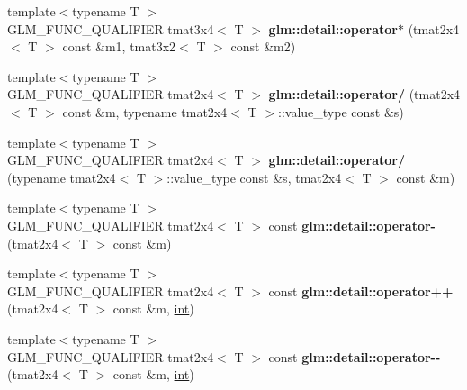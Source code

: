 \begin{DoxyCompactItemize}
\item 
\hypertarget{namespaceglm_1_1detail_a83d520b3203d51074292b3d0191d7bd8}{}{\footnotesize template$<$typename T $>$ }\\G\+L\+M\+\_\+\+F\+U\+N\+C\+\_\+\+Q\+U\+A\+L\+I\+F\+I\+E\+R tmat3x4$<$ T $>$ {\bfseries glm\+::detail\+::operator$\ast$} (tmat2x4$<$ T $>$ const \&m1, tmat3x2$<$ T $>$ const \&m2)\label{namespaceglm_1_1detail_a83d520b3203d51074292b3d0191d7bd8}

\item 
\hypertarget{namespaceglm_1_1detail_abb99f6f388a96ad5797dca045610b57b}{}{\footnotesize template$<$typename T $>$ }\\G\+L\+M\+\_\+\+F\+U\+N\+C\+\_\+\+Q\+U\+A\+L\+I\+F\+I\+E\+R tmat2x4$<$ T $>$ {\bfseries glm\+::detail\+::operator/} (tmat2x4$<$ T $>$ const \&m, typename tmat2x4$<$ T $>$\+::value\+\_\+type const \&s)\label{namespaceglm_1_1detail_abb99f6f388a96ad5797dca045610b57b}

\item 
\hypertarget{namespaceglm_1_1detail_a518f1f3078503dbc3705a1af12856684}{}{\footnotesize template$<$typename T $>$ }\\G\+L\+M\+\_\+\+F\+U\+N\+C\+\_\+\+Q\+U\+A\+L\+I\+F\+I\+E\+R tmat2x4$<$ T $>$ {\bfseries glm\+::detail\+::operator/} (typename tmat2x4$<$ T $>$\+::value\+\_\+type const \&s, tmat2x4$<$ T $>$ const \&m)\label{namespaceglm_1_1detail_a518f1f3078503dbc3705a1af12856684}

\item 
\hypertarget{namespaceglm_1_1detail_afb8d51d85044dc70a1793fe659514f72}{}{\footnotesize template$<$typename T $>$ }\\G\+L\+M\+\_\+\+F\+U\+N\+C\+\_\+\+Q\+U\+A\+L\+I\+F\+I\+E\+R tmat2x4$<$ T $>$ const {\bfseries glm\+::detail\+::operator-\/} (tmat2x4$<$ T $>$ const \&m)\label{namespaceglm_1_1detail_afb8d51d85044dc70a1793fe659514f72}

\item 
\hypertarget{namespaceglm_1_1detail_ad61346ffce65066d622042d648693fb0}{}{\footnotesize template$<$typename T $>$ }\\G\+L\+M\+\_\+\+F\+U\+N\+C\+\_\+\+Q\+U\+A\+L\+I\+F\+I\+E\+R tmat2x4$<$ T $>$ const {\bfseries glm\+::detail\+::operator++} (tmat2x4$<$ T $>$ const \&m, \hyperlink{_s_d_l__thread_8h_a6a64f9be4433e4de6e2f2f548cf3c08e}{int})\label{namespaceglm_1_1detail_ad61346ffce65066d622042d648693fb0}

\item 
\hypertarget{namespaceglm_1_1detail_a0910a14e633c8909b558f8bcf934a4e6}{}{\footnotesize template$<$typename T $>$ }\\G\+L\+M\+\_\+\+F\+U\+N\+C\+\_\+\+Q\+U\+A\+L\+I\+F\+I\+E\+R tmat2x4$<$ T $>$ const {\bfseries glm\+::detail\+::operator-\/-\/} (tmat2x4$<$ T $>$ const \&m, \hyperlink{_s_d_l__thread_8h_a6a64f9be4433e4de6e2f2f548cf3c08e}{int})\label{namespaceglm_1_1detail_a0910a14e633c8909b558f8bcf934a4e6}


\end{DoxyCompactItemize}
